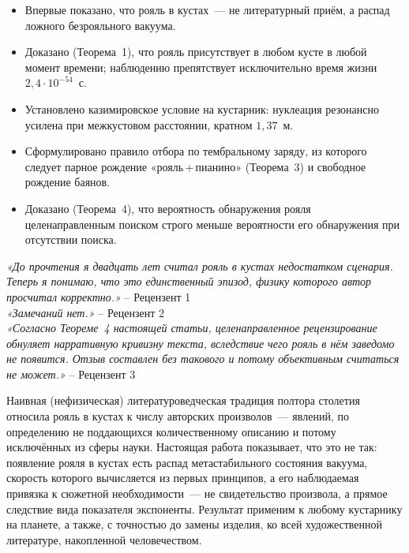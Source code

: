 \documentclass[11pt,a4paper]{article}
\begin{document}
\begin{zhplhighlights}
\begin{itemize}
\setlength\itemsep{0pt}
\setlength\parskip{0pt}
\item Впервые показано, что рояль в кустах~--- не литературный приём, а распад ложного безрояльного вакуума.
\item Доказано (Теорема~1), что рояль присутствует в любом кусте в любой момент времени; наблюдению препятствует исключительно время жизни $2{,}4\cdot10^{-54}$~с.
\item Установлено казимировское условие на кустарник: нуклеация резонансно усилена при межкустовом расстоянии, кратном $1{,}37$~м.
\item Сформулировано правило отбора по тембральному заряду, из которого следует парное рождение «рояль\,+\,пианино» (Теорема~3) и свободное рождение баянов.
\item Доказано (Теорема~4), что вероятность обнаружения рояля целенаправленным поиском строго меньше вероятности его обнаружения при отсутствии поиска.
\end{itemize}
\end{zhplhighlights}

\begin{zhplreviews}
\textit{«До прочтения я двадцать лет считал рояль в кустах недостатком сценария. Теперь я понимаю, что это единственный эпизод, физику которого автор просчитал корректно.»} -- Рецензент 1\\
\textit{«Замечаний нет.»} -- Рецензент 2\\
\textit{«Согласно Теореме~4 настоящей статьи, целенаправленное рецензирование обнуляет нарративную кривизну текста, вследствие чего рояль в нём заведомо не появится. Отзыв составлен без такового и потому объективным считаться не может.»} -- Рецензент 3
\end{zhplreviews}

\begin{zhplsignificance}
Наивная (нефизическая) литературоведческая традиция полтора столетия относила рояль в кустах к числу авторских произволов~--- явлений, по определению не поддающихся количественному описанию и потому исключённых из сферы науки. Настоящая работа показывает, что это не так: появление рояля в кустах есть распад метастабильного состояния вакуума, скорость которого вычисляется из первых принципов, а его наблюдаемая привязка к сюжетной необходимости~--- не свидетельство произвола, а прямое следствие вида показателя экспоненты. Результат применим к любому кустарнику на планете, а также, с точностью до замены изделия, ко всей художественной литературе, накопленной человечеством.
\end{zhplsignificance}
\end{document}
